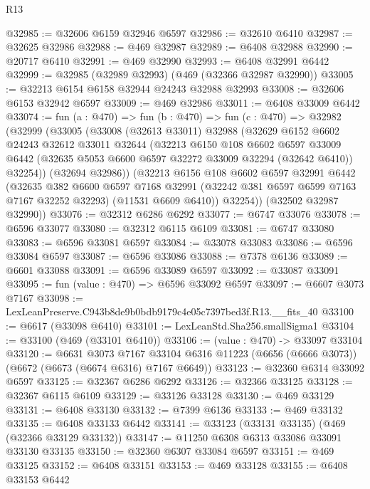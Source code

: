 \begin{lexlean}{R13}
\begin{coremodule}
@32985 := @32606 @6159 @32946 @6597
@32986 := @32610 @6410
@32987 := @32625 @32986
@32988 := @469 @32987
@32989 := @6408 @32988
@32990 := @20717 @6410
@32991 := @469 @32990
@32993 := @6408 @32991 @6442
@32999 := @32985 (@32989 @32993) (@469 (@32366 @32987 @32990))
@33005 := @32213 @6154 @6158 @32944 @24243 @32988 @32993
@33008 := @32606 @6153 @32942 @6597
@33009 := @469 @32986
@33011 := @6408 @33009 @6442
@33074 := fun (a : @470) =>
  fun (b : @470) =>
  fun (c : @470) =>
  @32982
    (@32999
      (@33005
        (@33008
          (@32613 @33011)
          @32988
          (@32629
            @6152
            @6602
            @24243
            @32612
            @33011
            @32644
            (@32213
              @6150
              @108
              @6602
              @6597
              @33009
              @6442
              (@32635 @5053 @6600 @6597 @32272 @33009 @32294 (@32642 @6410))
              @32254))
          (@32694 @32986))
        (@32213
          @6156
          @108
          @6602
          @6597
          @32991
          @6442
          (@32635
            @382
            @6600
            @6597
            @7168
            @32991
            (@32242 @381 @6597 @6599 @7163 @7167 @32252 @32293)
            (@11531 @6609 @6410))
          @32254))
      (@32502 @32987 @32990))
@33076 := @32312 @6286 @6292
@33077 := @6747 @33076
@33078 := @6596 @33077
@33080 := @32312 @6115 @6109
@33081 := @6747 @33080
@33083 := @6596 @33081 @6597
@33084 := @33078 @33083
@33086 := @6596 @33084 @6597
@33087 := @6596 @33086
@33088 := @7378 @6136
@33089 := @6601 @33088
@33091 := @6596 @33089 @6597
@33092 := @33087 @33091
@33095 := fun (value : @470) => @6596 @33092 @6597
@33097 := @6607 @3073 @7167
@33098 := LexLeanPreserve.C943b8de9b0bdb9179c4e05c7397bed3f.R13.__fits_40
@33100 := @6617 (@33098 @6410)
@33101 := LexLeanStd.Sha256.smallSigma1
@33104 := @33100 (@469 (@33101 @6410))
@33106 := (value : @470) -> @33097 @33104
@33120 := @6631
    @3073
    @7167
    @33104
    @6316
    @11223
    (@6656 (@6666 @3073))
    (@6672 (@6673 (@6674 @6316) @7167 @6649))
@33123 := @32360 @6314 @33092 @6597
@33125 := @32367 @6286 @6292
@33126 := @32366 @33125
@33128 := @32367 @6115 @6109
@33129 := @33126 @33128
@33130 := @469 @33129
@33131 := @6408 @33130
@33132 := @7399 @6136
@33133 := @469 @33132
@33135 := @6408 @33133 @6442
@33141 := @33123 (@33131 @33135) (@469 (@32366 @33129 @33132))
@33147 := @11250 @6308 @6313 @33086 @33091 @33130 @33135
@33150 := @32360 @6307 @33084 @6597
@33151 := @469 @33125
@33152 := @6408 @33151
@33153 := @469 @33128
@33155 := @6408 @33153 @6442

\end{coremodule}
\end{lexlean}
